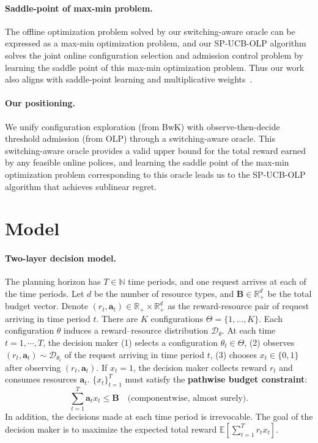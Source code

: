 \documentclass[11pt]{article}
\newcommand{\bB}{\mathbf{B}}
\newcommand{\ba}{\mathbf{a}}
\newcommand{\R}{\mathbb{R}}
\newcommand{\cD}{\mathcal{D}}
\begin{document}
\paragraph{Saddle-point of max-min problem.}
The offline optimization problem solved by our switching-aware oracle can be expressed as a max-min optimization problem, and our SP-UCB-OLP algorithm solves the joint online configuration selection and admission control problem by learning the saddle point of this max-min optimization problem. Thus our work also aligns with saddle-point learning and multiplicative weights~\citep{freund1997decision,arora2012multiplicative}. 

\paragraph{Our positioning.}
We unify configuration exploration (from BwK) with observe-then-decide threshold admission (from OLP) through a switching-aware oracle. This switching-aware oracle provides a valid upper bound for the total reward earned by any feasible online polices, and learning the saddle point of the max-min optimization problem corresponding to this oracle leads us to the SP-UCB-OLP algorithm that achieves sublinear regret.

\section{Model}
\label{sec:model}

\paragraph{Two-layer decision model.}
The planning horizon has $T \in \mathbb{N}$ time periods, and one request arrives at each of the time periods. Let $d$ be the number of resource types, and $\bB \in \R^d_+$ be the total budget vector. Denote $(r_t,\ba_t)\in \R_+ \times \R^d_+$ as the reward-resource pair of request arriving in time period $t$. There are $K$ configurations $\Theta = \{1, \ldots, K\}$.  Each configuration $\theta$ induces a reward--resource distribution $\cD_\theta$. At each time $t=1,\cdots,T$, the decision maker (1) selects a configuration $\theta_t \in \Theta$, (2) observes $(r_t, \ba_t) \sim \cD_{\theta_t}$ of the request arriving in time period $t$, (3) chooses $x_t \in \{0, 1\}$ after observing $(r_t, \ba_t)$. If $x_t = 1$, the decision maker collects reward $r_t$ and consumes resources $\ba_t$. $\{x_t\}_{t=1}^T$ must satisfy the \textbf{pathwise budget constraint}:
\[
\sum_{t=1}^T \ba_t x_t \le \bB \quad \text{(componentwise, almost surely)}.
\]
In addition, the decisions made at each time period is irrevocable. The goal of the decision maker is to maximize the expected total reward $\mathbb{E}[\sum_{t=1}^Tr_tx_t]$.
\end{document}
